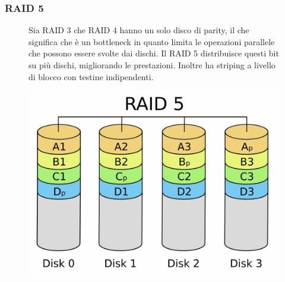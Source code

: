 \subsubsection*{RAID 5}
\begin{figure}[H]
    \centering
    \begin{minipage}{0.65\textwidth}
        Sia RAID 3 che RAID 4 hanno un solo disco di parity, il che significa che è un bottleneck in quanto limita le operazioni parallele che possono essere svolte dai dischi. Il RAID 5 distribuisce questi bit su più dischi, migliorando le prestazioni. Inoltre ha striping a livello di blocco con testine indipendenti.
    \end{minipage}
    \hfill
    \begin{minipage}{0.3\textwidth}
        \centering
        \includegraphics[width=1\linewidth]{assets/RAID_5.jpeg}
    \end{minipage}
\end{figure}

